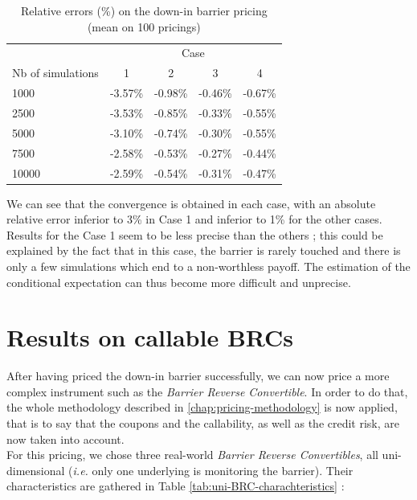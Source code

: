 \documentclass[a4paper,11pt,english]{book}
\begin{document}
\begin{table}
\centering
\begin{tabular}{l c c c c} 
& \multicolumn{4}{c}{Case} \\ 
\cmidrule(l){2-5} 
Nb of simulations & 1 & 2 & 3 & 4\\ %
\midrule %
1000 & -3.57\% & -0.98\% & -0.46\% & -0.67\%\\ %
2500 & -3.53\% & -0.85\% & -0.33\% & -0.55\%\\ %
5000 & -3.10\% & -0.74\% & -0.30\% & -0.55\%\\ %
7500 & -2.58\% & -0.53\% & -0.27\% & -0.44\%\\ %
10000 & -2.59\% & -0.54\% & -0.31\% & -0.47\%\\ %
\bottomrule %
\end{tabular}
\caption{Relative errors (\%) on the down-in barrier pricing (mean on 100 pricings)}
\label{tab:barrier-option-pricing}
\end{table}

We can see that the convergence is obtained in each case, with an absolute relative error inferior to 3\% in Case 1 and inferior to 1\% for the other cases. Results for the Case 1 seem to be less precise than the others ; this could be explained by the fact that in this case, the barrier is rarely touched and there is only a few simulations which end to a non-worthless payoff. The estimation of the conditional expectation can thus become more difficult and unprecise.

\section{Results on callable BRCs}
After having priced the down-in barrier successfully, we can now price a more complex instrument such as the \textit{Barrier Reverse Convertible}. In order to do that, the whole methodology described in \ref{chap:pricing-methodology} is now applied, that is to say that the coupons and the callability, as well as the credit risk, are now taken into account. \\

For this pricing, we chose three real-world \textit{Barrier Reverse Convertibles}, all uni-dimensional (\textit{i.e.} only one underlying is monitoring the barrier). Their characteristics are gathered in Table \ref{tab:uni-BRC-charachteristics} :
\end{document}
